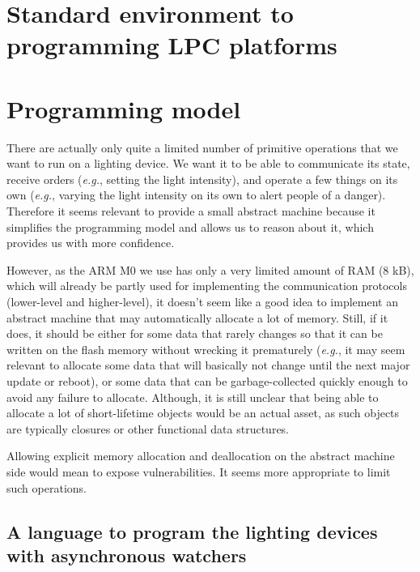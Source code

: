 \documentclass[12pt,twoside,a4paper]{article}
\def\eg{\emph{e.g.}}
\begin{document}
\section{Standard environment to programming LPC platforms}


\section{Programming model}
\label{sec:programming-model}

There are actually only quite a limited number of primitive operations
that we  want to run on  a lighting device. We  want it to  be able to
communicate  its  state,  receive   orders  (\eg,  setting  the  light
intensity),  and operate a  few things  on its  own (\eg,  varying the
light intensity on its own to  alert people of a danger). Therefore it
seems  relevant  to  provide  a  small  abstract  machine  because  it
simplifies the  programming model  and allows us  to reason  about it,
which provides us with more confidence.

However, as the ARM M0 we use has only a very limited amount of RAM (8
kB),  which   will  already  be  partly  used   for  implementing  the
communication  protocols (lower-level  and  higher-level), it  doesn't
seem  like a  good  idea to  implement  an abstract  machine that  may
automatically allocate a  lot of memory. Still, if  it does, it should
be either for some data that  rarely changes so that it can be written
on the flash memory without  wrecking it prematurely (\eg, it may seem
relevant to  allocate some data  that will basically not  change until
the  next  major  update  or   reboot),  or  some  data  that  can  be
garbage-collected  quickly enough  to avoid  any failure  to allocate.
Although, it  is still unclear  that being able  to allocate a  lot of
short-lifetime objects would  be an actual asset, as  such objects are
typically closures or other functional data structures.

Allowing explicit  memory allocation and deallocation  on the abstract
machine  side would  mean  to expose  vulnerabilities.  It seems  more
appropriate to limit such operations.


\subsection{A   language  to   program  the   lighting   devices  with
  asynchronous watchers}
\end{document}
